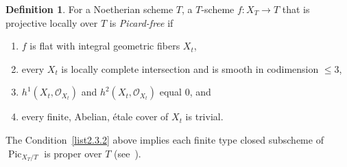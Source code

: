 \documentclass[11pt]{article}
\theoremstyle{definition}
\newtheorem{defi}[theo]{Definition}
\numberwithin{equation}{section}
\numberwithin{figure}{section}
\numberwithin{table}{section}
\newcommand{\mc}{\mathcal}
\newcommand{\OO}{\mc{O}}
\DeclareMathOperator{\Pic}{Pic}
\newcommand*{\romanenumi}{\renewcommand*{\theenumi}{\roman{enumi}}}
\begin{document}
\begin{defi}\cite[Definition~2.10]{Zhu} \label{defn-Zhu}
For a Noetherian scheme $T$, a $T$-scheme $f:X_T\to T$ that is projective locally over $T$ is \emph{Picard-free} if
\begin{enumerate}\romanenumi
\item \label{list2.3.1}$f$ is flat with integral geometric fibers $X_t$,
\item \label{list2.3.2}every $X_t$ is locally complete intersection and is smooth in codimension $\leq 3$,
\item \label{list2.3.3}$h^1(X_t,\OO_{X_t})$ and $h^2(X_t,\OO_{X_t})$ equal $0$, and
\item \label{list2.3.4}every finite, Abelian, étale cover of $X_t$ is trivial.
\end{enumerate}
\end{defi}

The Condition~\eqref{list2.3.2} above implies each finite type closed subscheme of $\Pic_{X_T/T}$ is proper over $T$ (see~\cite[XI, 3.13]{SGA2N}).
\end{document}
